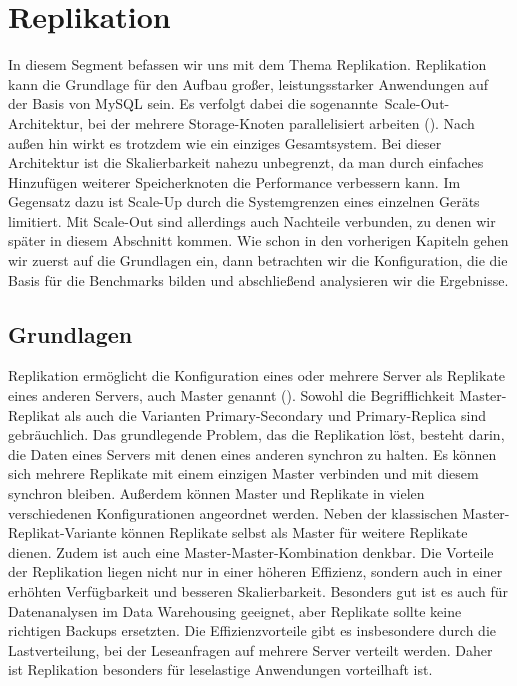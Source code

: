 
\chapter{Replikation}\label{ch:replikation}
In diesem Segment befassen wir uns mit dem Thema Replikation.
Replikation kann die Grundlage für den Aufbau großer, leistungsstarker Anwendungen auf der Basis von MySQL sein.
Es verfolgt dabei die sogenannte~\glqq Scale-Out\grqq-Architektur, bei der mehrere Storage-Knoten parallelisiert arbeiten (\cite{scale_out_eigenschaften}).
Nach außen hin wirkt es trotzdem wie ein einziges Gesamtsystem.
Bei dieser Architektur ist die Skalierbarkeit nahezu unbegrenzt, da man durch einfaches Hinzufügen weiterer Speicherknoten die Performance verbessern kann.
Im Gegensatz dazu ist Scale-Up durch die Systemgrenzen eines einzelnen Geräts limitiert.
Mit Scale-Out sind allerdings auch Nachteile verbunden, zu denen wir später in diesem Abschnitt kommen.
Wie schon in den vorherigen Kapiteln gehen wir zuerst auf die Grundlagen ein, dann betrachten wir die Konfiguration, die die Basis für die Benchmarks bilden und abschließend analysieren wir die Ergebnisse.

\section{Grundlagen}\label{sec:replication-grundlagen}
Replikation ermöglicht die Konfiguration eines oder mehrere Server als Replikate eines anderen Servers, auch Master genannt (\cite[pp. 447--477]{schwartz2012high}).
Sowohl die Begrifflichkeit Master-Replikat als auch die Varianten Primary-Secondary und Primary-Replica sind gebräuchlich.
Das grundlegende Problem, das die Replikation löst, besteht darin, die Daten eines Servers mit denen eines anderen synchron zu halten.
Es können sich mehrere Replikate mit einem einzigen Master verbinden und mit diesem synchron bleiben.
Außerdem können Master und Replikate in vielen verschiedenen Konfigurationen angeordnet werden.
Neben der klassischen Master-Replikat-Variante können Replikate selbst als Master für weitere Replikate dienen.
Zudem ist auch eine Master-Master-Kombination denkbar.
Die Vorteile der Replikation liegen nicht nur in einer höheren Effizienz, sondern auch in einer erhöhten Verfügbarkeit und besseren Skalierbarkeit.
Besonders gut ist es auch für Datenanalysen im Data Warehousing geeignet, aber Replikate sollte keine richtigen Backups ersetzten.
Die Effizienzvorteile gibt es insbesondere durch die Lastverteilung, bei der Leseanfragen auf mehrere Server verteilt werden.
Daher ist Replikation besonders für leselastige Anwendungen vorteilhaft ist.


